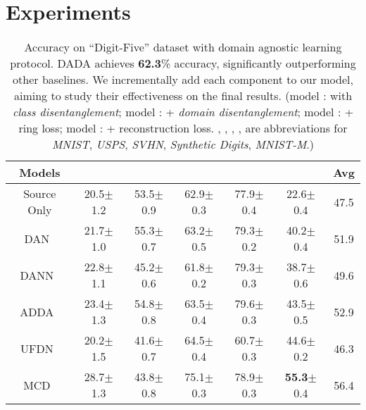 \documentclass{article}
\newcommand{\BU}[1]{\color{black!40!green}\textbf{#1}}
\newcommand{\BV}[1]{\color{black!10!blue}{\em #1}}
\begin{document}
 \section{Experiments}

\newcommand{\RomanNumeralCaps}[1]
    {\MakeUppercase{\romannumeral #1}}


\begin{table*}
\caption{Accuracy on ``Digit-Five'' dataset with domain agnostic learning protocol. DADA achieves \textbf{62.3}\% accuracy, significantly outperforming other baselines. We incrementally add each component to our model, aiming to study their effectiveness on the final results. (model \textbf{\RomanNumeralCaps{1}}: with \textit{class disentanglement}; model \textbf{\RomanNumeralCaps{2}}: \textbf{\RomanNumeralCaps{1}} + \textit{domain disentanglement}; model \textbf{\RomanNumeralCaps{3}}: \textbf{\RomanNumeralCaps{2}} + ring loss; model \textbf{\RomanNumeralCaps{4}}: \textbf{\RomanNumeralCaps{3}} + reconstruction loss. {\BV{mt}}, {\BV{up}}, {\BV{sv}}, {\BV{sy}}, {\BV{mm}} are abbreviations for \textit{MNIST}, \textit{USPS}, \textit{SVHN}, \textit{Synthetic Digits}, \textit{MNIST-M}.) } \label{table_digit_five}
\vspace{0.1in}
\centering
{
\begin{tabular}{c c c c c c  c}
\Xhline{1pt} 
{Models} &
 {\scriptsize{\BV{mt$\rightarrow$mm,sv,sy,up}} } &  
 {\scriptsize{\BV{mm$\rightarrow$mt,sv,sy,up}} } & 
 {\scriptsize{\BV{sv$\rightarrow$mt,mm,sy,up}} }& 
 {\scriptsize{\BV{sy$\rightarrow$mt,mm,sv,up}} }&    
 {\scriptsize{\BV{up$\rightarrow$mt,mm,sv,sy}} } & 
{{\BU{Avg}}} \\ 

\hline

Source Only &20.5$\pm$1.2 &53.5$\pm$0.9 &62.9$\pm$0.3 &77.9$\pm$0.4 &22.6$\pm$0.4 & 47.5 \\
DAN~\cite{long2015} & 21.7$\pm$1.0 & 55.3$\pm$0.7 & 63.2$\pm$0.5 & 79.3$\pm$0.2 & 40.2$\pm$0.4 & 51.9 \\
DANN~\cite{DANN} & 22.8$\pm$1.1 & 45.2$\pm$0.6 & 61.8$\pm$0.2 & 79.3$\pm$0.3 & 38.7$\pm$0.6 & 49.6 \\
 ADDA~\cite{adda} & 23.4$\pm$1.3 & 54.8$\pm$0.8 & 63.5$\pm$0.4 & 79.6$\pm$0.3 & 43.5$\pm$0.5& 52.9  \\


UFDN~\cite{ufdn}& 20.2$\pm$1.5 & 41.6$\pm$0.7 & 64.5$\pm$0.4 & 60.7$\pm$0.3 & 44.6$\pm$0.2 & 46.3 \\
 MCD~\cite{MCD_2018}&28.7$\pm$1.3 &43.8$\pm$0.8 &75.1$\pm$0.3 &78.9$\pm$0.3 &\textbf{55.3}$\pm$0.4 & 56.4 \\


\end{tabular}}
\end{table*}
\end{document}
